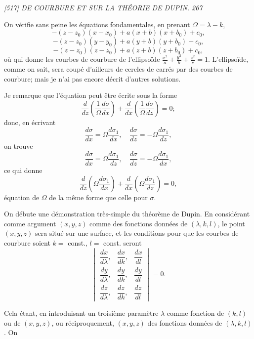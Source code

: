 \documentclass[11pt,a4paper]{book}
\begin{document}

\noindent\textit{[517] \hfill DE COURBURE ET SUR LA TH\'EORIE DE DUPIN. \hfill 267}

\medskip

On v\'erifie sans peine les \'equations fondamentales, en prenant $\Omega = \lambda - k$,
\[
- (z - z_0)(x - x_0) + a(x + b)(x + b_0) + c_0,
\]
\[
- (z - z_0)(y - y_0) + a(y + b)(y + b_0) + c_0,
\]
\[
- (z - z_0)(z - z_0) + a(z + b)(z + b_0) + c_0,
\]
o\`u qui donne les courbes de courbure de l'ellipso\"ide $\frac{x^2}{a} + \frac{y^2}{b} + \frac{z^2}{c} = 1$. L'ellipso\"ide,
comme on sait, sera coup\'e d'ailleurs de cercles de carr\'es par des courbes de courbure; mais je n'ai pas encore d\'ecrit d'autres solutions.

Je remarque que l'\'equation peut \^etre \'ecrite sous la forme
\[
\frac{d}{dz}\left(\frac{1}{\Omega}\frac{d\sigma}{dx}\right) + \frac{d}{dx}\left(\frac{1}{\Omega}\frac{d\sigma}{dz}\right) = 0;
\]
donc, en \'ecrivant
\[
\frac{d\sigma}{dx} = \Omega \frac{d\sigma_1}{dx}, \quad \frac{d\sigma}{dz} = -\Omega \frac{d\sigma_1}{dz},
\]
on trouve
\[
\frac{d\sigma}{dx} = \Omega \frac{d\sigma_1}{dz}, \quad \frac{d\sigma}{dz} = -\Omega \frac{d\sigma_1}{dx},
\]
ce qui donne
\[
\frac{d}{dz}\left(\Omega \frac{d\sigma_1}{dx}\right) + \frac{d}{dx}\left(\Omega \frac{d\sigma_1}{dz}\right) = 0,
\]
\'equation de $\Omega$ de la m\^eme forme que celle pour $\sigma$.

\medskip

On d\'ebute une d\'emonstration tr\`es-simple du th\'eor\`eme de Dupin. En consid\'erant
comme argument $(x, y, z)$ comme des fonctions donn\'ees de $(\lambda, k, l)$, le point $(x, y, z)$
sera situ\'e sur une surface, et les conditions pour que les courbes de courbure soient
$k = $ const., $l = $ const. seront
\[
\begin{vmatrix}
\dfrac{dx}{d\lambda}, & \dfrac{dx}{dk}, & \dfrac{dx}{dl} \\[6pt]
\dfrac{dy}{d\lambda}, & \dfrac{dy}{dk}, & \dfrac{dy}{dl} \\[6pt]
\dfrac{dz}{d\lambda}, & \dfrac{dz}{dk}, & \dfrac{dz}{dl}
\end{vmatrix} = 0.
\]

Cela \'etant, en introduisant un troisi\`eme param\`etre $\lambda$ comme fonction de $(k, l)$ ou
de $(x, y, z)$, ou r\'eciproquement, $(x, y, z)$ des fonctions donn\'ees de $(\lambda, k, l)$. On
\end{document}
